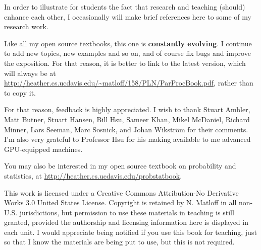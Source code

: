 In order to illustrate for students the fact that research and teaching
(should) enhance each other, I occasionally will make brief references
here to some of my research work.

Like all my open source textbooks, this one is {\bf constantly
evolving}.  I continue to add new topics, new examples and so on, and of
course fix bugs and improve the exposition.  For that reason, it is
better to link to the latest version, which will always be at
\url{http://heather.cs.ucdavis.edu/~matloff/158/PLN/ParProcBook.pdf},
rather than to copy it.

For that reason, feedback is highly appreciated.  I wish to thank Stuart
Ambler, Matt Butner, Stuart Hansen, Bill Hsu, Sameer Khan, Mikel
McDaniel, Richard Minner, Lars Seeman, Marc Sosnick,
and Johan Wikstr{\"o}m for their
comments.  I'm also very grateful to Professor Hsu for his making
available to me advanced GPU-equipped machines.

You may also be interested in my open source textbook on probability and
statistics, at \url{http://heather.cs.ucdavis.edu/probstatbook}.

This work is licensed under a Creative Commons Attribution-No Derivative
Works 3.0 United States License. Copyright is retained by N. Matloff in
all non-U.S. jurisdictions, but permission to use these materials in
teaching is still granted, provided the authorship and licensing
information here is displayed in each unit. I would appreciate being
notified if you use this book for teaching, just so that I know the
materials are being put to use, but this is not required.

